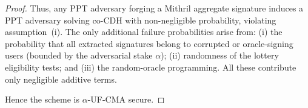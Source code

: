 \documentclass{article}
\begin{document}
\begin{proof}
Thus, any PPT adversary forging a Mithril aggregate signature induces a
PPT adversary solving co-CDH with non-negligible probability, violating
assumption~(i).  The only additional failure probabilities arise from:
(i) the probability that all extracted signatures belong to corrupted or
oracle-signing users (bounded by the adversarial stake $\alpha$);
(ii) randomness of the lottery eligibility tests; and
(iii) the random-oracle programming.  All these contribute only
negligible additive terms.

Hence the scheme is $\alpha$-UF-CMA secure.
\end{proof}
\end{document}
